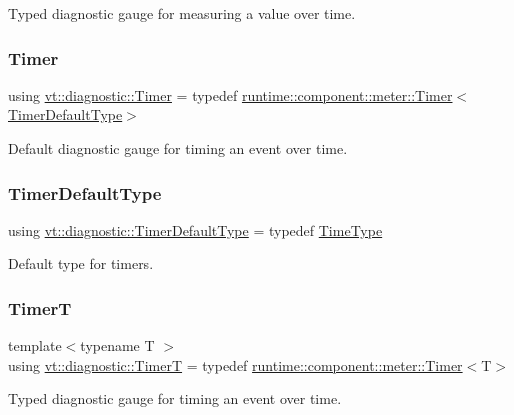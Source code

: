 Typed diagnostic gauge for measuring a value over time. 

\mbox{\label{namespacevt_1_1diagnostic_a84795feb3d3500ee2d7d59248499efb8}} 
\subsubsection{\texorpdfstring{Timer}{Timer}}
{\footnotesize\ttfamily using \hyperlink{namespacevt_1_1diagnostic_a84795feb3d3500ee2d7d59248499efb8}{vt\+::diagnostic\+::\+Timer} = typedef \hyperlink{structvt_1_1runtime_1_1component_1_1meter_1_1_timer}{runtime\+::component\+::meter\+::\+Timer}$<$\hyperlink{namespacevt_1_1diagnostic_a068855648cf3673d78a9c45a8a95f567}{Timer\+Default\+Type}$>$}



Default diagnostic gauge for timing an event over time. 

\mbox{\label{namespacevt_1_1diagnostic_a068855648cf3673d78a9c45a8a95f567}} 
\subsubsection{\texorpdfstring{Timer\+Default\+Type}{TimerDefaultType}}
{\footnotesize\ttfamily using \hyperlink{namespacevt_1_1diagnostic_a068855648cf3673d78a9c45a8a95f567}{vt\+::diagnostic\+::\+Timer\+Default\+Type} = typedef \hyperlink{namespacevt_a876a9d0cd5a952859c72de8a46881442}{Time\+Type}}



Default type for timers. 

\mbox{\label{namespacevt_1_1diagnostic_a02535ac129513fc0ee0f68f85130b9aa}} 
\subsubsection{\texorpdfstring{TimerT}{TimerT}}
{\footnotesize\ttfamily template$<$typename T $>$ \\
using \hyperlink{namespacevt_1_1diagnostic_a02535ac129513fc0ee0f68f85130b9aa}{vt\+::diagnostic\+::\+TimerT} = typedef \hyperlink{structvt_1_1runtime_1_1component_1_1meter_1_1_timer}{runtime\+::component\+::meter\+::\+Timer}$<$T$>$}



Typed diagnostic gauge for timing an event over time. 

